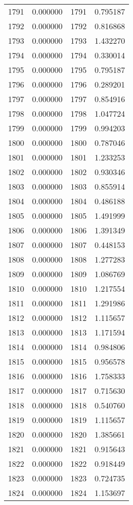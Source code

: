 \documentclass[12pt]{article}
\begin{document}
\begin{longtable}{@{}cccc@{}}
1791 & 0.000000 & 1791 & 0.795187 \\
1792 & 0.000000 & 1792 & 0.816868 \\
1793 & 0.000000 & 1793 & 1.432270 \\
1794 & 0.000000 & 1794 & 0.330014 \\
1795 & 0.000000 & 1795 & 0.795187 \\
1796 & 0.000000 & 1796 & 0.289201 \\
1797 & 0.000000 & 1797 & 0.854916 \\
1798 & 0.000000 & 1798 & 1.047724 \\
1799 & 0.000000 & 1799 & 0.994203 \\
1800 & 0.000000 & 1800 & 0.787046 \\
1801 & 0.000000 & 1801 & 1.233253 \\
1802 & 0.000000 & 1802 & 0.930346 \\
1803 & 0.000000 & 1803 & 0.855914 \\
1804 & 0.000000 & 1804 & 0.486188 \\
1805 & 0.000000 & 1805 & 1.491999 \\
1806 & 0.000000 & 1806 & 1.391349 \\
1807 & 0.000000 & 1807 & 0.448153 \\
1808 & 0.000000 & 1808 & 1.277283 \\
1809 & 0.000000 & 1809 & 1.086769 \\
1810 & 0.000000 & 1810 & 1.217554 \\
1811 & 0.000000 & 1811 & 1.291986 \\
1812 & 0.000000 & 1812 & 1.115657 \\
1813 & 0.000000 & 1813 & 1.171594 \\
1814 & 0.000000 & 1814 & 0.984806 \\
1815 & 0.000000 & 1815 & 0.956578 \\
1816 & 0.000000 & 1816 & 1.758333 \\
1817 & 0.000000 & 1817 & 0.715630 \\
1818 & 0.000000 & 1818 & 0.540760 \\
1819 & 0.000000 & 1819 & 1.115657 \\
1820 & 0.000000 & 1820 & 1.385661 \\
1821 & 0.000000 & 1821 & 0.915643 \\
1822 & 0.000000 & 1822 & 0.918449 \\
1823 & 0.000000 & 1823 & 0.724735 \\
1824 & 0.000000 & 1824 & 1.153697 \\

\end{longtable}
\end{document}
